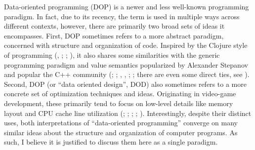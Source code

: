 \documentclass[
  openany]{book}
\theoremstyle{definition}
\theoremstyle{definition}
\theoremstyle{definition}
\theoremstyle{definition}
\theoremstyle{remark}
\begin{document}
Data-oriented programming (DOP) is a newer and less well-known programming paradigm. In fact, due to its recency, the term is used in multiple ways across different contexts, however, there are primarily two broad sets of ideas it encompasses. First, DOP sometimes refers to a more abstract paradigm, concerned with structure and organization of code. Inspired by the Clojure style of programming (, ; ; ), it also shares some similarities with the generic programming paradigm and value semantics popularized by Alexander Stepanov and popular the C++ community (; ; , , ; ; there are even some direct ties, see ). Second, DOP (or ``data oriented design'', DOD) also sometimes refers to a more concrete set of optimization techniques and ideas. Originating in video-game development, these primarily tend to focus on low-level details like memory layout and CPU cache line utilization (; ; ; ; ). Interestingly, despite their distinct uses, both interpretations of ``data-oriented programming'' converge on many similar ideas about the structure and organization of computer programs. As such, I believe it is justified to discuss them here as a single paradigm.
\end{document}
